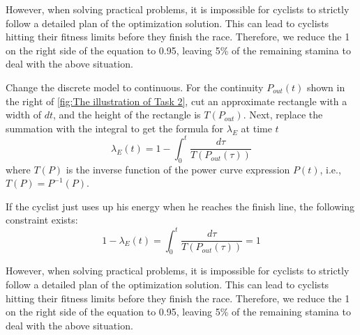 \documentclass{mcmthesis}
\begin{document}
However, when solving practical problems, it is impossible for cyclists to strictly follow a detailed
plan of the optimization solution. This can lead to cyclists hitting their fitness limits before they
finish the race. Therefore, we reduce the 1 on the right side of the equation to 0.95, leaving 5\% of
the remaining stamina to deal with the above situation.

Change the discrete model to continuous. For the continuity \( P_{out}(t) \) shown in the right of \autoref{fig:The illustration of Task 2}, cut an approximate rectangle with a width of \( dt \), and the height of the rectangle is \( T(P_{out}) \). Next, replace the summation with the integral to get the formula for \( \lambda_E \) at time \( t \)
\begin{equation}
\lambda_E(t) = 1 - \int_0^t \frac{d\tau}{T(P_{out}(\tau))}
\end{equation}
where \( T(P) \) is the inverse function of the power curve expression \( P(t) \), i.e., \( T(P) = P^{-1}(P) \).


If the cyclist just uses up his energy when he reaches the finish line, the following constraint exists:
\begin{equation}
1 - \lambda_E(t) = \int_0^t \frac{d\tau}{T(P_{out}(\tau))} = 1
\end{equation}

However, when solving practical problems, it is impossible for cyclists to strictly follow a detailed
plan of the optimization solution. This can lead to cyclists hitting their fitness limits before they
finish the race. Therefore, we reduce the 1 on the right side of the equation to 0.95, leaving 5\% of
the remaining stamina to deal with the above situation.
\end{document}

